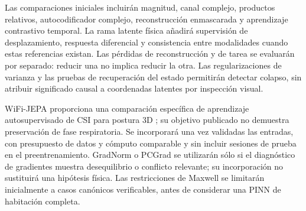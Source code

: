 Las comparaciones iniciales incluirán magnitud, canal complejo, productos relativos,
autocodificador complejo, reconstrucción enmascarada y aprendizaje contrastivo temporal.
La rama latente física añadirá supervisión de desplazamiento, respuesta diferencial
y consistencia entre modalidades cuando estas referencias existan. Las pérdidas de
reconstrucción y de tarea se evaluarán por separado: reducir una no implica reducir
la otra. Las regularizaciones de varianza y las pruebas de recuperación del estado
permitirán detectar colapso, sin atribuir significado causal a coordenadas latentes
por inspección visual.

WiFi-JEPA proporciona una comparación específica de aprendizaje autosupervisado de
CSI para postura 3D \citep{Kim2026WiFiJEPA}; su objetivo publicado no demuestra
preservación de fase respiratoria. Se incorporará una vez validadas las entradas,
con presupuesto de datos y cómputo comparable y sin incluir sesiones de prueba en el
preentrenamiento. GradNorm o PCGrad se utilizarán sólo si el diagnóstico de gradientes
muestra desequilibrio o conflicto relevante; su incorporación no sustituirá una
hipótesis física. Las restricciones de Maxwell se limitarán inicialmente a casos
canónicos verificables, antes de considerar una PINN de habitación completa.
